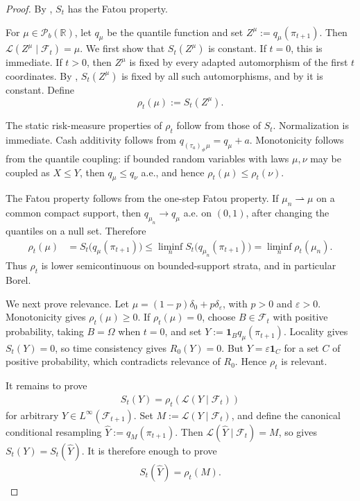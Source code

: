 \documentclass[10pt,a4paper]{amsart}
\newcommand{\F}{\mathcal{F}}
\newcommand{\Pc}{\mathcal P}
\newcommand{\R}{\mathbb{R}}
\newcommand{\law}{\mathcal{L}}
\newcommand{\weaklyto}{\rightharpoonup}
\begin{document}
\begin{proof}
By , \(S_t\) has the Fatou property.

For \(\mu\in\Pc_b(\R)\), let \(q_\mu\) be the quantile function and set
\(Z^\mu:=q_\mu(\pi_{t+1})\). Then \(\law(Z^\mu\mid\F_t)=\mu\). We first show
that \(S_t(Z^\mu)\) is constant. If \(t=0\), this is immediate. If \(t>0\),
then \(Z^\mu\) is fixed by every adapted automorphism of the first
\(t\) coordinates. By ,
\(S_t(Z^\mu)\) is fixed by all such automorphisms, and by
 it is constant. Define
\[
\rho_t(\mu):=S_t(Z^\mu).
\]

The static risk-measure properties of \(\rho_t\) follow from those of \(S_t\).
Normalization is immediate. Cash additivity follows from
\(q_{(\tau_a)_\#\mu}=q_\mu+a\). Monotonicity follows from the quantile
coupling: if bounded random variables with laws \(\mu,\nu\) may be coupled as
\(X\le Y\), then \(q_\mu\le q_\nu\) a.e., and hence
\(\rho_t(\mu)\le\rho_t(\nu)\).

The Fatou property follows from the one-step Fatou property. If
\(\mu_n\weaklyto\mu\) on a common compact support, then
\(q_{\mu_n}\to q_\mu\) a.e. on \((0,1)\), after changing the quantiles on a
null set. Therefore
\begin{align}
\rho_t(\mu)
&=
S_t\big(q_\mu(\pi_{t+1})\big)
\le
\liminf_n S_t\big(q_{\mu_n}(\pi_{t+1})\big)
=
\liminf_n\rho_t(\mu_n).
\label{eq:rho-fatou-from-St}
\end{align}
Thus \(\rho_t\) is lower semicontinuous on bounded-support strata, and in
particular Borel.

We next prove relevance. Let
\(\mu=(1-p)\delta_0+p\delta_\varepsilon\), with \(p>0\) and
\(\varepsilon>0\). Monotonicity gives \(\rho_t(\mu)\ge0\). If
\(\rho_t(\mu)=0\), choose \(B\in\F_t\) with positive probability, taking
\(B=\Omega\) when \(t=0\), and set \(Y:=\mathbf 1_Bq_\mu(\pi_{t+1})\).
Locality gives \(S_t(Y)=0\), so time consistency gives \(R_0(Y)=0\). But
\(Y=\varepsilon\mathbf 1_C\) for a set \(C\) of positive probability, which
contradicts relevance of \(R_0\). Hence \(\rho_t\) is relevant.

It remains to prove
\begin{align}
S_t(Y)=\rho_t(\law(Y\mid\F_t))
\label{eq:one-step-identification-target}
\end{align}
for arbitrary \(Y\in L^\infty(\F_{t+1})\). Set
\(M:=\law(Y\mid\F_t)\), and define the canonical conditional resampling
\(\widehat Y:=q_M(\pi_{t+1})\). Then
\(\law(\widehat Y\mid\F_t)=M\), so
 gives \(S_t(Y)=S_t(\widehat Y)\). It is
therefore enough to prove
\begin{align}
S_t(\widehat Y)=\rho_t(M).
\label{eq:one-step-resampling-target}
\end{align}


\end{proof}
\end{document}
